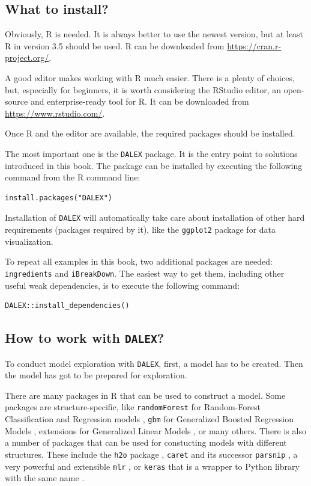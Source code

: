 \documentclass[12pt,]{krantz}
\theoremstyle{definition}
\theoremstyle{definition}
\theoremstyle{definition}
\theoremstyle{remark}
\begin{document}
\hypertarget{what-to-install}{%
\subsection{What to install?}\label{what-to-install}}

Obviously, R \citep{RcoreT} is needed. It is always better to use the
newest version, but at least R in version 3.5 should be used. R can be
downloaded from \url{https://cran.r-project.org/}.

A good editor makes working with R much easier. There is a plenty of
choices, but, especially for beginners, it is worth considering the
RStudio editor, an open-source and enterprise-ready tool for R. It can
be downloaded from \url{https://www.rstudio.com/}.

Once R and the editor are available, the required packages should be
installed.

The most important one is the \texttt{DALEX} package. It is the entry
point to solutions introduced in this book. The package can be installed
by executing the following command from the R command line:

\begin{verbatim}
install.packages("DALEX")
\end{verbatim}

Installation of \texttt{DALEX} will automatically take care about
installation of other hard requirements (packages required by it), like
the \texttt{ggplot2} package for data visualization.

To repeat all examples in this book, two additional packages are needed:
\texttt{ingredients} and \texttt{iBreakDown}. The easiest way to get
them, including other useful weak dependencies, is to execute the
following command:

\begin{verbatim}
DALEX::install_dependencies()
\end{verbatim}

\hypertarget{how-to-work-with-dalex}{%
\subsection{\texorpdfstring{How to work with
\texttt{DALEX}?}{How to work with DALEX?}}\label{how-to-work-with-dalex}}

To conduct model exploration with \texttt{DALEX}, first, a model has to
be created. Then the model has got to be prepared for exploration.

There are many packages in R that can be used to construct a model. Some
packages are structure-specific, like \texttt{randomForest} for
Random-Forest Classification and Regression models \citep{randomForest},
\texttt{gbm} for Generalized Boosted Regression Models \citep{gbm},
extensions for Generalized Linear Models \citep{rms}, or many others.
There is also a number of packages that can be used for constucting
models with different structures. These include the \texttt{h2o} package
\citep{h2oPackage}, \texttt{caret} \citep{caret} and its successor
\texttt{parsnip} \citep{parsnipPackage}, a very powerful and extensible
\texttt{mlr} \citep{mlr}, or \texttt{keras} that is a wrapper to Python
library with the same name \citep{kerasPackage}.
\end{document}
